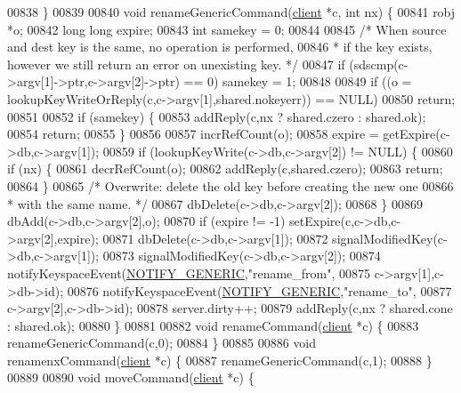 \begin{DoxyCode}
00838 \}
00839 
00840 \textcolor{keywordtype}{void} renameGenericCommand(\hyperlink{structclient}{client} *c, \textcolor{keywordtype}{int} nx) \{
00841     robj *o;
00842     \textcolor{keywordtype}{long} \textcolor{keywordtype}{long} expire;
00843     \textcolor{keywordtype}{int} samekey = 0;
00844 
00845     \textcolor{comment}{/* When source and dest key is the same, no operation is performed,}
00846 \textcolor{comment}{     * if the key exists, however we still return an error on unexisting key. */}
00847     \textcolor{keywordflow}{if} (sdscmp(c->argv[1]->ptr,c->argv[2]->ptr) == 0) samekey = 1;
00848 
00849     \textcolor{keywordflow}{if} ((o = lookupKeyWriteOrReply(c,c->argv[1],shared.nokeyerr)) == NULL)
00850         \textcolor{keywordflow}{return};
00851 
00852     \textcolor{keywordflow}{if} (samekey) \{
00853         addReply(c,nx ? shared.czero : shared.ok);
00854         \textcolor{keywordflow}{return};
00855     \}
00856 
00857     incrRefCount(o);
00858     expire = getExpire(c->db,c->argv[1]);
00859     \textcolor{keywordflow}{if} (lookupKeyWrite(c->db,c->argv[2]) != NULL) \{
00860         \textcolor{keywordflow}{if} (nx) \{
00861             decrRefCount(o);
00862             addReply(c,shared.czero);
00863             \textcolor{keywordflow}{return};
00864         \}
00865         \textcolor{comment}{/* Overwrite: delete the old key before creating the new one}
00866 \textcolor{comment}{         * with the same name. */}
00867         dbDelete(c->db,c->argv[2]);
00868     \}
00869     dbAdd(c->db,c->argv[2],o);
00870     \textcolor{keywordflow}{if} (expire != -1) setExpire(c,c->db,c->argv[2],expire);
00871     dbDelete(c->db,c->argv[1]);
00872     signalModifiedKey(c->db,c->argv[1]);
00873     signalModifiedKey(c->db,c->argv[2]);
00874     notifyKeyspaceEvent(\hyperlink{server_8h_a9fa53dd1068e62365f3964ad3479eec2}{NOTIFY\_GENERIC},\textcolor{stringliteral}{"rename\_from"},
00875         c->argv[1],c->db->id);
00876     notifyKeyspaceEvent(\hyperlink{server_8h_a9fa53dd1068e62365f3964ad3479eec2}{NOTIFY\_GENERIC},\textcolor{stringliteral}{"rename\_to"},
00877         c->argv[2],c->db->id);
00878     server.dirty++;
00879     addReply(c,nx ? shared.cone : shared.ok);
00880 \}
00881 
00882 \textcolor{keywordtype}{void} renameCommand(\hyperlink{structclient}{client} *c) \{
00883     renameGenericCommand(c,0);
00884 \}
00885 
00886 \textcolor{keywordtype}{void} renamenxCommand(\hyperlink{structclient}{client} *c) \{
00887     renameGenericCommand(c,1);
00888 \}
00889 
00890 \textcolor{keywordtype}{void} moveCommand(\hyperlink{structclient}{client} *c) \{

\end{DoxyCode}
